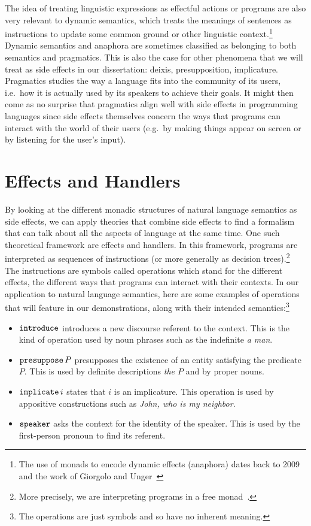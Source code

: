 The idea of treating linguistic expressions as effectful actions or
programs are also very relevant to dynamic semantics, which treats the
meanings of sentences as instructions to update some common ground or other
linguistic context.\footnote{The use of monads to encode dynamic effects
  (anaphora) dates back to 2009 and the work of Giorgolo and
  Unger~\cite{giorgolo2009coreference,unger2012dynamic}} Dynamic semantics
and anaphora are sometimes classified as belonging to both semantics and
pragmatics. This is also the case for other phenomena that we will treat as
side effects in our dissertation: deixis, presupposition,
implicature. Pragmatics studies the way a language fits into the community
of its users, i.e.\ how it is actually used by its speakers to achieve
their goals. It might then come as no surprise that pragmatics align well
with side effects in programming languages since side effects themselves
concern the ways that programs can interact with the world of their users
(e.g.\ by making things appear on screen or by listening for the user's
input).


\section*{Effects and Handlers}

By looking at the different monadic structures of natural language
semantics as side effects, we can apply theories that combine side effects
to find a formalism that can talk about all the aspects of language at the
same time. One such theoretical framework are effects and handlers. In this
framework, programs are interpreted as sequences of instructions (or more
generally as decision trees).\footnote{More precisely, we are interpreting
  programs in a free monad~\cite{swierstra2008data}.} The instructions are
symbols called operations which stand for the different effects, the
different ways that programs can interact with their contexts. In our
application to natural language semantics, here are some examples of
operations that will feature in our demonstrations, along with their
intended semantics:\footnote{The operations are just symbols and so have no
  inherent meaning.}

\begin{itemize}
\item $\mathtt{introduce}$ introduces a new discourse referent to the
  context. This is the kind of operation used by noun phrases such as the
  indefinite \emph{a man}.
\item $\mathtt{presuppose}\,P$ presupposes the existence of an entity
  satisfying the predicate $P$. This is used by definite descriptions
  \emph{the $P$} and by proper nouns.
\item $\mathtt{implicate}\,i$ states that $i$ is an implicature. This
  operation is used by appositive constructions such as \emph{John, who is
    my neighbor}.
\item $\mathtt{speaker}$ asks the context for the identity of the speaker. This
  is used by the first-person pronoun to find its referent.
\end{itemize}

